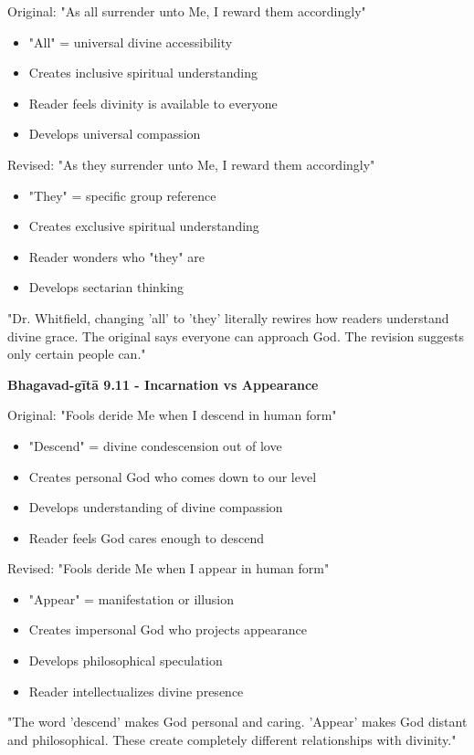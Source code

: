 \documentclass[11pt,twoside]{book}
\begin{document}
Original: "As all surrender unto Me, I reward them accordingly"
\begin{itemize}
\item "All" = universal divine accessibility
\item Creates inclusive spiritual understanding
\item Reader feels divinity is available to everyone
\item Develops universal compassion
\end{itemize}

Revised: "As they surrender unto Me, I reward them accordingly"
\begin{itemize}
\item "They" = specific group reference
\item Creates exclusive spiritual understanding
\item Reader wonders who "they" are
\item Develops sectarian thinking
\end{itemize}

"Dr. Whitfield, changing 'all' to 'they' literally rewires how readers understand divine grace. The original says everyone can approach God. The revision suggests only certain people can."

\textbf{\textbf{Bhagavad-gītā 9.11 - Incarnation vs Appearance}}

Original: "Fools deride Me when I descend in human form"
\begin{itemize}
\item "Descend" = divine condescension out of love
\item Creates personal God who comes down to our level
\item Develops understanding of divine compassion
\item Reader feels God cares enough to descend
\end{itemize}

Revised: "Fools deride Me when I appear in human form"
\begin{itemize}
\item "Appear" = manifestation or illusion
\item Creates impersonal God who projects appearance
\item Develops philosophical speculation
\item Reader intellectualizes divine presence
\end{itemize}

"The word 'descend' makes God personal and caring. 'Appear' makes God distant and philosophical. These create completely different relationships with divinity."
\end{document}
